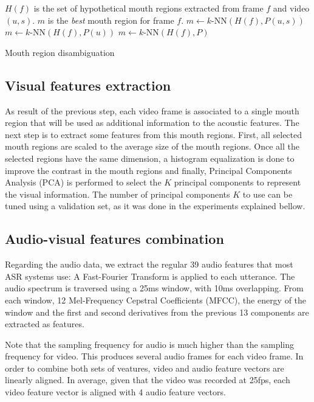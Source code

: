 \documentclass[12pt,a4paper]{article}
\begin{document}
\begin{algorithm}
\begin{algorithmic}
\Require $H(f)$ is the set of hypothetical mouth regions extracted from frame $f$ and video $(u,s)$.
\Ensure $m$ is the \emph{best} mouth region for frame $f$.
 
\State $m \leftarrow k\text{-NN}(H(f), P(u,s))$
 
\State $m \leftarrow k\text{-NN}(H(f), P(u))$
\Else {}
\State $m \leftarrow k\text{-NN}(H(f), P)$
\EndIf
\end{algorithmic}
\caption{Mouth region disambiguation}
\label{alg:mouth_disambiguation}
\end{algorithm}

\subsection{Visual features extraction}
As result of the previous step, each video frame is associated to a single mouth region that will be used as additional information to the acoustic features. The next step is to extract some features from this mouth regions. First, all selected mouth regions are scaled to the average size of the mouth regions. Once all the selected regions have the same dimension, a histogram equalization is done to improve the contrast in the mouth regions and finally, Principal Components Analysis (PCA) is performed to select the $K$ principal components to represent the visual information. The number of principal components $K$ to use can be tuned using a validation set, as it was done in the experiments explained bellow.

\subsection{Audio-visual features combination}
Regarding the audio data, we extract the regular 39 audio features that most ASR systems use: A Fast-Fourier Transform is applied to each utterance. The audio spectrum is traversed using a 25ms window, with 10ms overlapping. From each window, 12 Mel-Frequency Cepstral Coefficients (MFCC), the energy of the window and the first and second derivatives from the previous 13 components are extracted as features.

Note that the sampling frequency for audio is much higher than the sampling frequency for video. This produces several audio frames for each video frame. In order to combine both sets of veatures, video and audio feature vectors are linearly aligned. In average, given that the video was recorded at 25fps, each video feature vector is aligned with 4 audio feature vectors.
\end{document}
